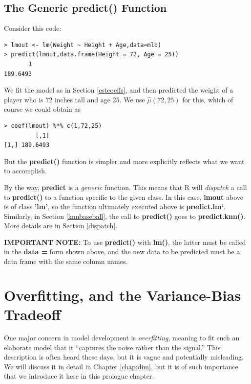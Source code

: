 \subsection{The Generic predict() Function}
\label{predictfun}

Consider this code:

\begin{lstlisting}
> lmout <- lm(Weight ~ Height + Age,data=mlb)
> predict(lmout,data.frame(Height = 72, Age = 25))
       1 
189.6493 
\end{lstlisting}

We fit the model as in Section \ref{estcoeffs}, and then predicted the
weight of a player who is 72 inches tall and age 25.  We use
$\widehat{\mu}(72,25)$ for this, which of course we could obtain as

\begin{lstlisting}
> coef(lmout) %*% c(1,72,25)
         [,1]
[1,] 189.6493
\end{lstlisting}

But the {\bf predict()} function is simpler and more explicitly reflects
what we want to accomplish.  

By the way, {\bf predict} is a {\it generic} function.  This means that
R will {\it dispatch} a call to {\bf predict()} to a function specific
to the given class.  In this case, {\bf lmout} above is of class {\bf
'lm'}, so the function ultimately executed above is {\bf predict.lm`}.
Similarly, in Section \ref{knnbaseball}, the call to {\bf predict()}
goes to {\bf predict.knn()}.  More details are in Section
\ref{dispatch}.

{\bf IMPORTANT NOTE:}  To use {\bf predict()} with {\bf lm()}, the
latter must be called in the {\bf data =} form shown above, and the new
data to be predicted must be a data frame with the same column names.

\section{Overfitting, and the Variance-Bias \\ Tradeoff} 
\label{overfit}

One major concern in model development is {\it overfitting}, meaning to
fit such an elaborate model that it ``captures the noise rather than the
signal.''  This description is often heard these days, but it is vague
and potentially misleading. We will discuss it in detail
in Chapter \ref{chap:dim}, but it is of such importance that we 
introduce it here in this prologue chapter.  

